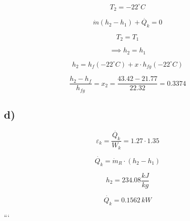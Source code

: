 \[ T_2 = -22^\circ C \]

\[
\dot{m}(h_2 - h_1) + \dot{Q_k} = 0
\]

\[ T_2 = T_1 \]

\[ \implies h_2 = h_1 \]

\[ h_2 = h_f(-22^\circ C) + x \cdot h_{fg}(-22^\circ C) \]

\[
\frac{h_2 - h_f}{h_{fg}} = x_2 = \frac{43.42 - 21.77}{22.32} = 0.3374
\]

\subsection*{d)}

\[ \varepsilon_k = \frac{\dot{Q_k}}{W_k} = 1.27 \cdot 1.35 \]

\[
\dot{Q_k} = \dot{m}_R \cdot (h_2 - h_1)
\]

\[ h_2 = 234.08 \frac{kJ}{kg} \]

\[ \dot{Q_k} = 0.1562 \, kW \]

```